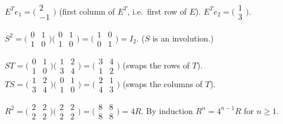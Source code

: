 \begin{solutions}
    \item $E^{T} e_{1} = \bigl(\begin{smallmatrix} 2 \\ -1 \end{smallmatrix}\bigr)$ (first column of $E^{T}$, i.e.\ first row of $E$). $E^{T} e_{2} = \bigl(\begin{smallmatrix} 1 \\ 3 \end{smallmatrix}\bigr)$.

    \item $S^{2} = \bigl(\begin{smallmatrix} 0 & 1 \\ 1 & 0 \end{smallmatrix}\bigr)\bigl(\begin{smallmatrix} 0 & 1 \\ 1 & 0 \end{smallmatrix}\bigr) = \bigl(\begin{smallmatrix} 1 & 0 \\ 0 & 1 \end{smallmatrix}\bigr) = I_{2}$. ($S$ is an involution.)

    \item $S T = \bigl(\begin{smallmatrix} 0 & 1 \\ 1 & 0 \end{smallmatrix}\bigr)\bigl(\begin{smallmatrix} 1 & 2 \\ 3 & 4 \end{smallmatrix}\bigr) = \bigl(\begin{smallmatrix} 3 & 4 \\ 1 & 2 \end{smallmatrix}\bigr)$ (swaps the rows of $T$). $T S = \bigl(\begin{smallmatrix} 1 & 2 \\ 3 & 4 \end{smallmatrix}\bigr)\bigl(\begin{smallmatrix} 0 & 1 \\ 1 & 0 \end{smallmatrix}\bigr) = \bigl(\begin{smallmatrix} 2 & 1 \\ 4 & 3 \end{smallmatrix}\bigr)$ (swaps the columns of $T$).

    \item $R^{2} = \bigl(\begin{smallmatrix} 2 & 2 \\ 2 & 2 \end{smallmatrix}\bigr)\bigl(\begin{smallmatrix} 2 & 2 \\ 2 & 2 \end{smallmatrix}\bigr) = \bigl(\begin{smallmatrix} 8 & 8 \\ 8 & 8 \end{smallmatrix}\bigr) = 4 R$. By induction $R^{n} = 4^{n - 1} R$ for $n \ge 1$.


\end{solutions}
